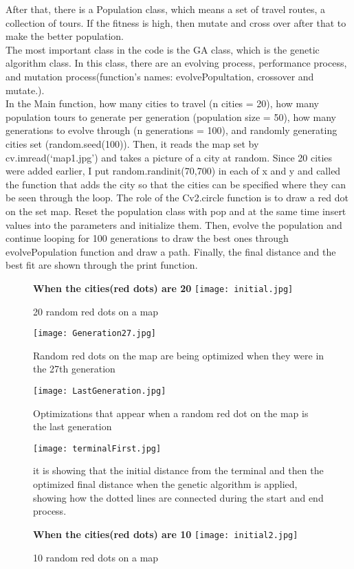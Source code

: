 \documentclass[12pt]{article}
\begin{document}
After that, there is a Population class, which means a set of travel routes, a collection of tours. If the fitness is high, then mutate and cross over after that to make the better population.\\

The most important class in the code is the GA class, which is the genetic algorithm class. In this class, there are an evolving process, performance process, and mutation process(function’s names: evolvePopultation, crossover and mutate.).\\

In the Main function, how many cities to travel (n cities = 20), how many population tours to generate per generation (population size = 50), how many generations to evolve through (n generations = 100), and randomly generating cities set (random.seed(100)). Then, it reads the map set by cv.imread(‘map1.jpg’) and takes a picture of a city at random. Since 20 cities were added earlier, I put random.randinit(70,700) in each of x and y and called the function that adds the city so that the cities can be specified where they can be seen through the loop. The role of the Cv2.circle function is to draw a red dot on the set map. Reset the population class with pop and at the same time insert values into the parameters and initialize them. Then, evolve the population and continue looping for 100 generations to draw the best ones through evolvePopulation function and draw a path. Finally, the final distance and the best fit are shown through the print function.

\begin{figure}[h]
        \centering\textbf{When the cities(red dots) are 20}  
        \texttt{[image: initial.jpg]}
        \caption{\label{fig:reults}20 random red dots on a map}
\end{figure}
\newpage

\begin{figure}[h]
    \texttt{[image: Generation27.jpg]}
    \caption{\label{fig:reults}Random red dots on the map are being optimized when they were in the 27th generation}
    \texttt{[image: LastGeneration.jpg]}
    \caption{\label{fig:reults}Optimizations that appear when a random red dot on the map is the last generation}
\end{figure}
\newpage

\begin{figure}[h]
    \texttt{[image: terminalFirst.jpg]}
    \caption{\label{fig:reults}it is showing that the initial distance from the terminal and then the optimized final distance when the genetic algorithm is applied, showing how the dotted lines are connected during the start and end process.\\} 
    \centering\textbf{When the cities(red dots) are 10}   
    \texttt{[image: initial2.jpg]}
    \caption{\label{fig:reults}10 random red dots on a map}    
\end{figure}
\newpage
\end{document}
